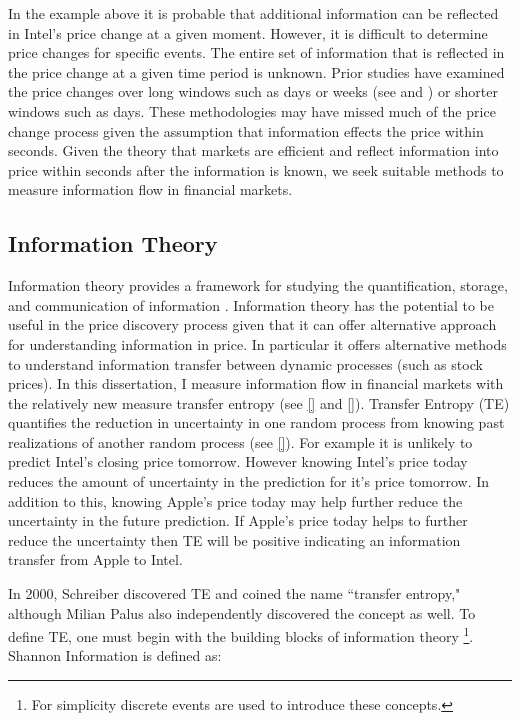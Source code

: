 In the example above it is probable that additional information can be reflected in Intel's price change at a given moment. However, it is difficult to determine price changes for specific events. The entire set of  information that is reflected in the price change at a given time period is unknown.  Prior studies have examined the price changes over long windows such as days or weeks (see \cite{Foster1981} and \cite{Baginiski 1987}) or shorter windows such as days. These methodologies may have missed much of the price change process given the assumption that information effects the price within seconds.  Given the theory that markets are efficient and reflect information into price within seconds after the information is known, we seek suitable methods to measure information flow in financial markets.

\subsection{Information Theory } \label{sec:InformationTheory}
Information theory provides a framework for studying the quantification, storage, and communication of information \cite{InfoTheoryApplications}.  Information theory has the potential to be useful in the price discovery process given that it can offer alternative approach for understanding information in price. In particular it offers alternative methods to understand information transfer between dynamic processes (such as stock prices). In this dissertation, I measure information flow in financial markets with the relatively new measure transfer entropy (see \ref{} and \ref{}). Transfer Entropy (TE) quantifies the reduction in uncertainty in one random process from knowing past realizations of another random process (see \ref{}). For example it is unlikely to predict Intel's closing price tomorrow. However knowing Intel's price today reduces the amount of uncertainty in the prediction for it's price tomorrow. In addition to this, knowing Apple's price today may help further reduce the uncertainty in the future prediction. If Apple's price today helps to further reduce the uncertainty then TE will be positive indicating an information transfer from Apple to Intel. 

In 2000, Schreiber \cite{IntroToTransferEntropy} discovered TE and coined the name ``transfer entropy," although Milian Palus \cite{IntroToTransferEntropy2} also independently discovered the concept as well. To define TE, one must begin with the building blocks of information theory \footnote{For simplicity discrete events are used to introduce these concepts.}.  Shannon Information is defined as: 

